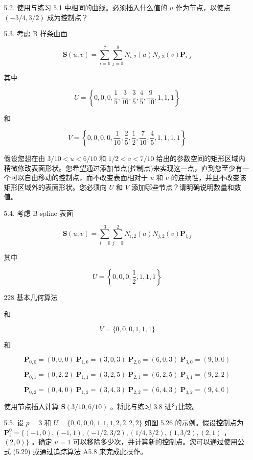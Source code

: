 \documentclass[../main.tex]{subfiles}
\begin{document}
5.2. 使用与练习 5.1 中相同的曲线。必须插入什么值的 \(u\) 作为节点，以使点 \(\left( {-3/4,3/2}\right)\) 成为控制点？

5.3. 考虑 B 样条曲面

\[
\mathbf{S}\left( {u,v}\right)  = \mathop{\sum }\limits_{{i = 0}}^{7}\mathop{\sum }\limits_{{j = 0}}^{8}{N}_{i,2}\left( u\right) {N}_{j,3}\left( v\right) {\mathbf{P}}_{i,j}
\]

其中

\[
U = \left\{  {0,0,0,\frac{1}{5},\frac{3}{10},\frac{3}{5},\frac{4}{5},\frac{9}{10},1,1,1}\right\}
\]

和

\[
V = \left\{  {0,0,0,0,\frac{1}{10},\frac{2}{5},\frac{1}{2},\frac{7}{10},\frac{4}{5},1,1,1,1}\right\}
\]

假设您想在由 \(3/{10} < u < 6/{10}\) 和 \(1/2 < v < 7/{10}\) 给出的参数空间的矩形区域内稍微修改表面形状。您希望通过添加节点(控制点)来实现这一点，直到您至少有一个可以自由移动的控制点，而不改变表面相对于 \(u\) 和 \(v\) 的连续性，并且不改变该矩形区域外的表面形状。您必须向 \(U\) 和 \(V\) 添加哪些节点？请明确说明数量和数值。

5.4. 考虑 B-spline 表面

\[
\mathbf{S}\left( {u,v}\right)  = \mathop{\sum }\limits_{{i = 0}}^{3}\mathop{\sum }\limits_{{j = 0}}^{2}{N}_{i,2}\left( u\right) {N}_{j,2}\left( v\right) {\mathbf{P}}_{i,j}
\]

其中

\[
U = \left\{  {0,0,0,\frac{1}{2},1,1,1}\right\}
\]

228 基本几何算法

和

\[
V = \{ 0,0,0,1,1,1\}
\]

和

\[
{\mathbf{P}}_{0,0} = \left( {0,0,0}\right) \;{\mathbf{P}}_{1,0} = \left( {3,0,3}\right) \;{\mathbf{P}}_{2,0} = \left( {6,0,3}\right) \;{\mathbf{P}}_{3,0} = \left( {9,0,0}\right)
\]

\[
{\mathbf{P}}_{0,1} = \left( {0,2,2}\right) \;{\mathbf{P}}_{1,1} = \left( {3,2,5}\right) \;{\mathbf{P}}_{2,1} = \left( {6,2,5}\right) \;{\mathbf{P}}_{3,1} = \left( {9,2,2}\right)
\]

\[
{\mathbf{P}}_{0,2} = \left( {0,4,0}\right) \;{\mathbf{P}}_{1,2} = \left( {3,4,3}\right) \;{\mathbf{P}}_{2,2} = \left( {6,4,3}\right) \;{\mathbf{P}}_{3,2} = \left( {9,4,0}\right)
\]

使用节点插入计算 \(\mathbf{S}\left( {3/{10},6/{10}}\right)\) 。将此与练习 3.8 进行比较。

5.5. 设 \(p = 3\) 和 \(U = \{ 0,0,0,0,1,1,1,2,2,2,2\}\) 如图 5.26 的示例。假设控制点为 \({\mathbf{P}}_{i}^{0} = \{ \left( {-1,0}\right) ,\left( {-1,1}\right) ,\left( {-1/2,3/2}\right) ,\left( {1/4,3/2}\right) ,\left( {1,3/2}\right) ,\left( {2,1}\right)\) ， \(\left( {2,0}\right) \}\) 。确定 \(u = 1\) 可以移除多少次，并计算新的控制点。您可以通过使用公式 (5.29) 或通过追踪算法 A5.8 来完成此操作。



\clearpage
\end{document}
